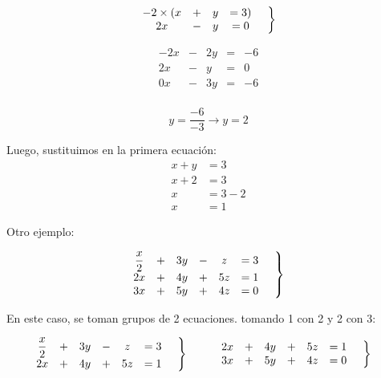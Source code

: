 \documentclass[12pt]{article}
\begin{document}
    \begin{equation*}
        \left.
        \begin{matrix}
            -2\times(x &+& y &=3)\\
            2x &-& y &=0
        \end{matrix}
        \hspace*{0.5cm}\right\rbrace
    \end{equation*}

    \begin{equation*}
        \begin{matrix}
            -2x &-& 2y &=&-6\\
            2x &-& y &=&0\\
            \hline
            0x &-& 3y &=&-6\\
        \end{matrix}
    \end{equation*}


    $$ y=\frac{-6}{-3} \rightarrow y=2 $$

    Luego, sustituimos en la primera ecuación:
    \begin{align*}
        x+y &=3 \\
        x+2 &=3 \\
        x&=3-2\\
        x&=1
    \end{align*}

    Otro ejemplo:

   \begin{equation*}
        \left.
        \begin{matrix}
            \displaystyle\frac{x}{2} &+& 3y &-& z &= 3 \\
            2x &+& 4y &+&5z &= 1\\
            3x &+& 5y &+& 4z &=0
        \end{matrix}
        \hspace*{0.5cm}\right\rbrace
    \end{equation*}


    En este caso, se toman grupos de 2 ecuaciones. tomando 1 con 2 y 2 con 3:

   \begin{align*}
        \left.
        \begin{matrix}
            \displaystyle\frac{x}{2} &+& 3y &-& z &= 3 \\
            2x &+& 4y &+&5z &= 1\\
        \end{matrix}
        \hspace*{0.5cm}\right\rbrace\hspace*{1cm}&
        \left.
        \begin{matrix}
            2x &+& 4y &+&5z &= 1\\
            3x &+& 5y &+& 4z &=0
        \end{matrix}
        \hspace*{0.5cm}\right\rbrace
    \end{align*}
\end{document}
